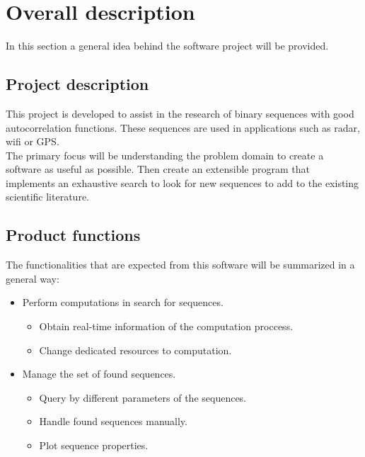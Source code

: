 \section{Overall description}

  In this section a general idea behind the software project will be provided.
  \subsection{Project description}

  This project is developed to assist in the research of binary sequences with
  good autocorrelation functions. These sequences are used in applications such
  as radar, wifi or GPS.\\

  The primary focus will be understanding the problem domain to create a
  software as useful as possible. Then create an extensible program that
  implements an exhaustive search to look for new sequences to add to the
  existing scientific literature.\\

  \subsection{Product functions}

  The functionalities that are expected from
  this software will be summarized in a general way:

  \begin{itemize}
    \item Perform computations in search for sequences.\\
            \begin{itemize}
              \item Obtain real-time information of the computation proccess.
              \item Change dedicated resources to computation.
            \end{itemize}
    \item Manage the set of found sequences.
            \begin{itemize}
              \item Query by different parameters of the sequences.
              \item Handle found sequences manually.
              \item Plot sequence properties.
            \end{itemize}
  \end{itemize}

